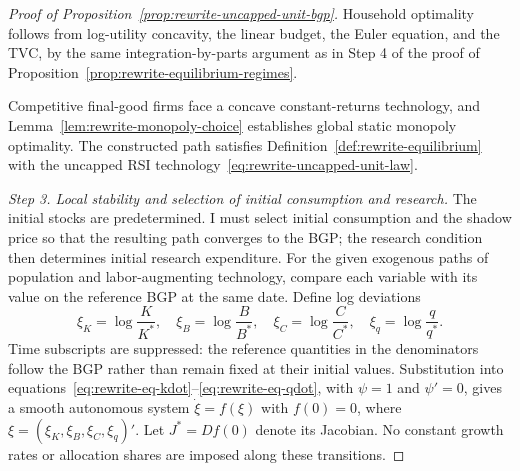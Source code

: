 \begin{proof}[Proof of Proposition~\ref{prop:rewrite-uncapped-unit-bgp}]
Household optimality follows from log-utility concavity, the linear budget,
the Euler equation, and the TVC, by the same integration-by-parts argument
as in Step 4 of the proof of Proposition~\ref{prop:rewrite-equilibrium-regimes}.

Competitive final-good firms
face a concave constant-returns technology, and
Lemma~\ref{lem:rewrite-monopoly-choice} establishes global static monopoly
optimality. The constructed path satisfies Definition~\ref{def:rewrite-equilibrium}
with the uncapped RSI technology~\eqref{eq:rewrite-uncapped-unit-law}.

\medskip
\textit{Step 3. Local stability and selection of initial consumption and research.}
\label{proof:rewrite-uncapped-unit-local}
The initial stocks are predetermined. I must select initial consumption
and the shadow price so that the resulting path converges to the BGP;
the research condition then determines initial research expenditure.
For the given exogenous paths of population and labor-augmenting technology,
compare each variable with its value on the reference BGP at the same date.
Define log deviations
\begin{equation}
 \xi_K=\log\frac K{K^*},\quad
 \xi_B=\log\frac B{B^*},\quad
 \xi_C=\log\frac C{C^*},\quad
 \xi_q=\log\frac q{q^*}.
 \label{eq:rewrite-uncapped-unit-deviations}
\end{equation}
Time subscripts are suppressed: the reference quantities in the denominators
follow the BGP rather than remain fixed at their initial values.
Substitution into equations~\eqref{eq:rewrite-eq-kdot}--\eqref{eq:rewrite-eq-qdot},
with $\psi=1$ and $\psi'=0$, gives a smooth autonomous system
$\dot\xi=f(\xi)$ with $f(0)=0$, where $\xi=(\xi_K,\xi_B,\xi_C,\xi_q)'$.
Let $J^*=Df(0)$ denote its Jacobian. No constant growth rates or
allocation shares are imposed along these transitions.


\end{proof}
